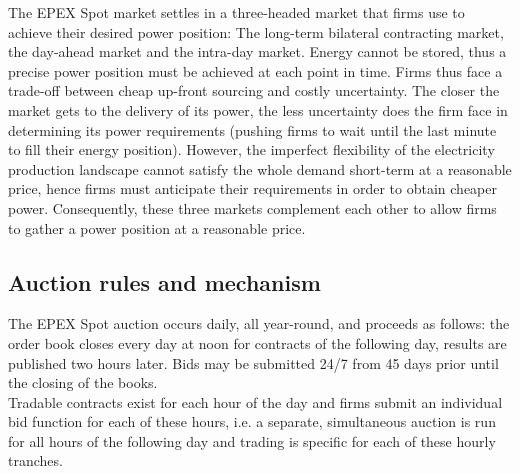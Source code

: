
The EPEX Spot market settles in a three-headed market that firms use to achieve their desired power position: The long-term bilateral contracting market, the day-ahead market and the intra-day market. Energy cannot be stored, thus a precise power position must be achieved at each point in time. Firms thus face a trade-off between cheap up-front sourcing and costly uncertainty. The closer the market gets to the delivery of its power, the less uncertainty does the firm face in determining its power requirements (pushing firms to wait until the last minute to fill their energy position). However, the imperfect flexibility of the electricity production landscape cannot satisfy the whole demand short-term at a reasonable price, hence firms must anticipate their requirements in order to obtain cheaper power. Consequently, these three markets complement each other to allow firms to gather a power position at a reasonable price. 


\subsection{Auction rules and mechanism}
\label{epexrules}
The EPEX Spot auction occurs daily, all year-round, and proceeds as follows: the order book closes every day at noon for contracts of the following day, results are published two hours later. Bids may be submitted 24/7 from 45 days prior until the closing of the books. \\

Tradable contracts exist for each hour of the day and firms submit an individual bid function for each of these hours, i.e. a separate, simultaneous auction is run for all hours of the following day and trading is specific for each of these hourly tranches.  \\

